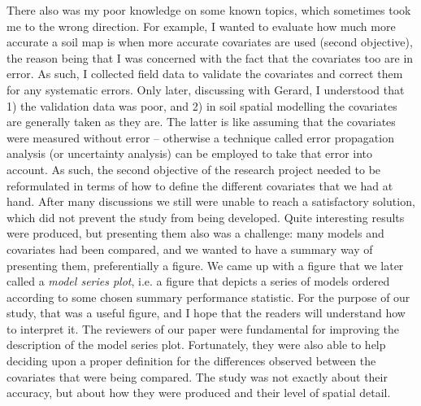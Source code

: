 There also was my poor knowledge on some known topics, which sometimes took me to the wrong direction. For 
example, I wanted to evaluate how much more accurate a soil map is when more accurate covariates are used 
(second objective), the reason being that I was concerned with the fact that the covariates too are in error. 
As such, I collected field data to validate the covariates and correct them for any systematic errors. Only 
later, discussing with Gerard, I understood that 1) the validation data was poor, and 2) in soil spatial 
modelling the covariates are generally taken as they are. The latter is like assuming that the covariates were 
measured without error -- otherwise a technique called error propagation analysis (or uncertainty analysis) can 
be employed to take that error into account. As such, the second objective of the research project needed to be 
reformulated in terms of how to define the different covariates that we had at hand. After many discussions we 
still were unable to reach a satisfactory solution, which did not prevent the study from being developed. Quite 
interesting results were produced, but presenting them also was a challenge: many models and covariates had 
been compared, and we wanted to have a summary way of presenting them, preferentially a figure. We came up with 
a figure that we later called a \emph{model series plot}, i.e. a figure that depicts a series of models ordered 
according to some chosen summary performance statistic. For the purpose of our study, that was a useful figure, 
and I hope that the readers will understand how to interpret it. The reviewers of our paper were fundamental 
for improving the description of the model series plot. Fortunately, they were also able to help deciding upon 
a proper definition for the differences observed between the covariates that were being compared. The study was 
not exactly about their accuracy, but about how they were produced and their level of spatial detail.

